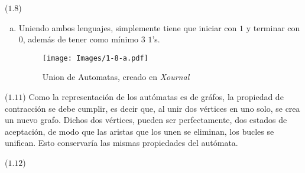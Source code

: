 \begin{mdframed}[style = warning]
	\begin{problem}
		($1.8$)
		\begin{enumerate}[a)]
			\item Uniendo ambos lenguajes, simplemente tiene que iniciar con $1$ y terminar con $0$, además de tener como mínimo $3$ $1$'s.
			\begin{figure}[H]
				\centering
				\texttt{[image: Images/1-8-a.pdf]}
				\caption{Union de Automatas, creado en \textit{Xournal}}
				\label{Union}
			\end{figure}
		\end{enumerate}		 
	\end{problem}
\end{mdframed}














\begin{mdframed}[style = warning]
	\begin{problem}
		($1.11$) Como la representación de los autómatas es de gráfos, la propiedad de contracción se debe cumplir, es decir que, al unir dos vértices en uno solo, se crea un nuevo grafo. Dichos dos vértices, pueden ser perfectamente, dos estados de aceptación, de modo que las aristas que los unen se eliminan, los bucles se unifican. Esto conservaría las mismas propiedades del autómata.
	\end{problem}
\end{mdframed}
















\begin{mdframed}[style = warning]
	\begin{problem}
		($1.12$) 	 
	\end{problem}
\end{mdframed}














